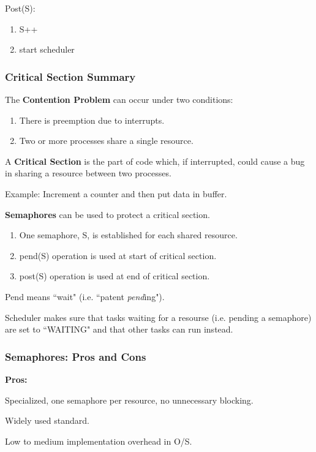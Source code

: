 \documentclass{article}	%
\begin{document}
Post(S):
\begin{enumerate}
  \item S++
  \item start scheduler
\end{enumerate}



\subsubsection{Critical Section Summary}

The {\bf Contention Problem} can occur under two conditions:
\begin{enumerate}
	\item There is preemption due to interrupts.
        \item Two or more processes share a single resource.
\end{enumerate}
A {\bf Critical Section} is the part of code which, if interrupted, could cause a bug in sharing a resource between
two processes.

Example:   Increment a counter and then put data in buffer.

{\bf Semaphores} can be used to protect a critical section.

\begin{enumerate}
	\item One semaphore, S,  is established for each shared resource.
        \item pend(S) operation is used at start of critical section.
        \item post(S) operation is used at end of critical section.
\end{enumerate}

Pend means ``wait" (i.e. ``patent {\it pend}ing").

Scheduler makes sure that tasks waiting for a resourse (i.e. pending a semaphore)
are set to ``WAITING" and that other tasks can run instead.





\subsubsection*{Semaphores: Pros and Cons}
{\bf Pros:}

Specialized, one semaphore per resource, no
unnecessary blocking.

Widely used standard.

Low to medium implementation overhead in O/S.
\end{document}
